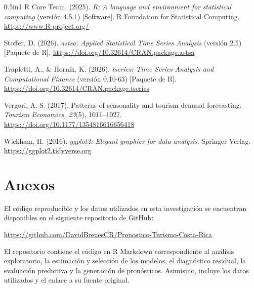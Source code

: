 \documentclass[12pt]{article}
\begin{document}
\begin{hangparas}{0.5in}{1}
R Core Team. (2025). 
\textit{R: A language and environment for statistical 
computing} (versión 4.5.1) [Software]. 
R Foundation for Statistical Computing.
\url{https://www.R-project.org/}

Stoffer, D. (2026). 
\textit{astsa: Applied Statistical Time Series Analysis} 
(versión 2.5) [Paquete de R].
\url{https://doi.org/10.32614/CRAN.package.astsa}

Trapletti, A., \& Hornik, K. (2026). 
\textit{tseries: Time Series Analysis and Computational 
Finance} (versión 0.10-63) [Paquete de R].
\url{https://doi.org/10.32614/CRAN.package.tseries}

Vergori, A. S. (2017). Patterns of seasonality and 
tourism demand forecasting. 
\textit{Tourism Economics, 23}(5), 1011--1027.
\url{https://doi.org/10.1177/1354816616656418}

Wickham, H. (2016). 
\textit{ggplot2: Elegant graphics for data analysis}. 
Springer-Verlag.
\url{https://ggplot2.tidyverse.org}

\end{hangparas}



\clearpage

\section*{Anexos}

El código reproducible y los datos utilizados en esta 
investigación se encuentran disponibles en el siguiente 
repositorio de GitHub:

\begin{center}
\url{https://github.com/DavidBrenesCR/Pronostico-Turismo-Costa-Rica}
\end{center}

El repositorio contiene el código en R Markdown 
correspondiente al análisis exploratorio, la estimación 
y selección de los modelos, el diagnóstico residual, 
la evaluación predictiva y la generación de pronósticos. 
Asimismo, incluye los datos utilizados y el enlace 
a su fuente original.
\end{document}
